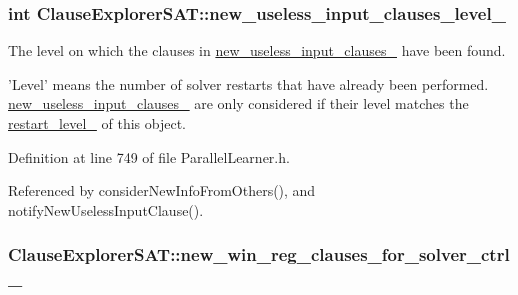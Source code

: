\hypertarget{classClauseExplorerSAT_a67eeafbba9da9c87534f7ef26531a57a}{
\subsubsection[{new\-\_\-useless\-\_\-input\-\_\-clauses\-\_\-level\-\_\-}]{\setlength{\rightskip}{0pt plus 5cm}int Clause\-Explorer\-S\-A\-T\-::new\-\_\-useless\-\_\-input\-\_\-clauses\-\_\-level\-\_\-\hspace{0.3cm}{\ttfamily [protected]}}}\label{classClauseExplorerSAT_a67eeafbba9da9c87534f7ef26531a57a}


The level on which the clauses in \hyperlink{classClauseExplorerSAT_a3d1bdb9a6484c85af655a4eed1ee5f19}{new\-\_\-useless\-\_\-input\-\_\-clauses\-\_\-} have been found. 

'Level' means the number of solver restarts that have already been performed. \hyperlink{classClauseExplorerSAT_a3d1bdb9a6484c85af655a4eed1ee5f19}{new\-\_\-useless\-\_\-input\-\_\-clauses\-\_\-} are only considered if their level matches the \hyperlink{classClauseExplorerSAT_a0b5d716111026dd1cb4efe5855e2fe2f}{restart\-\_\-level\-\_\-} of this object. 

Definition at line 749 of file Parallel\-Learner.\-h.



Referenced by consider\-New\-Info\-From\-Others(), and notify\-New\-Useless\-Input\-Clause().

\hypertarget{classClauseExplorerSAT_a7d923928f3cb6209b29f5cc5104b5fe2}{
\subsubsection[{new\-\_\-win\-\_\-reg\-\_\-clauses\-\_\-for\-\_\-solver\-\_\-ctrl\-\_\-}]{ Clause\-Explorer\-S\-A\-T\-::new\-\_\-win\-\_\-reg\-\_\-clauses\-\_\-for\-\_\-solver\-\_\-ctrl\-\_\-\hspace{0.3cm}{\ttfamily [protected]}}}\label{classClauseExplorerSAT_a7d923928f3cb6209b29f5cc5104b5fe2}


